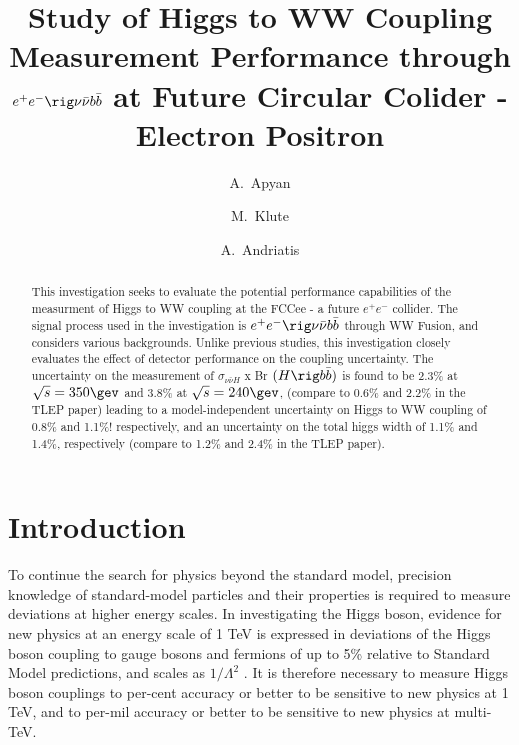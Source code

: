 \documentclass[preprintnumbers,nofootinbib,noshowpacs,eqsecnum,prd,superscriptaddress,letterpaper]{revtex4}
\begin{document}
\title{Study of Higgs to WW Coupling Measurement Performance through $e^+e^-\rig\nu\bar{\nu} b\bar{b}$ at Future
Circular Colider - Electron Positron}

\author{A.~Apyan}
\author{M.~Klute}
\author{A.~Andriatis}

\begin{abstract}
This investigation seeks to evaluate the potential performance capabilities of the measurment of Higgs to WW coupling at the FCCee - a future $e^+e^-$ collider. The signal process used in the investigation is $e^+e^-\rig\nu\bar{\nu} b\bar{b}$ through WW Fusion, and considers various backgrounds. Unlike previous studies, this investigation closely evaluates the effect of detector performance on the coupling uncertainty. The uncertainty on the measurement of  $\sigma_{\nu\bar{\nu}H}$ x Br $(H \rig b\bar{b})$ is found to be 2.3\% at $\sqrt{s} = 350 \gev$ and 3.8\% at $\sqrt{s} = 240 \gev$, (compare to 0.6\% and 2.2\% in the TLEP paper) leading to a model-independent uncertainty on Higgs to WW coupling of 0.8\% and 1.1\%! respectively, and an uncertainty on the total higgs width of 1.1\% and 1.4\%, respectively (compare to 1.2\% and 2.4\% in the TLEP paper).
\end{abstract}

\maketitle
\tableofcontents
\newpage

\section{Introduction}
\label{sec:intro}


To continue the search for physics beyond the standard model, precision knowledge of standard-model particles and their properties is required to measure deviations at higher energy scales. In investigating the Higgs boson, evidence for new physics at an energy scale of 1 TeV is expressed in deviations of the Higgs boson coupling to gauge bosons and fermions of up to 5\% relative to Standard Model predictions, and scales as $1/{\Lambda^2}$ \cite{tlep}. It is therefore necessary to measure Higgs boson couplings to per-cent accuracy or better to be sensitive to new physics at 1 TeV, and to per-mil accuracy or better to be sensitive to new  physics at multi-TeV.
\end{document}
